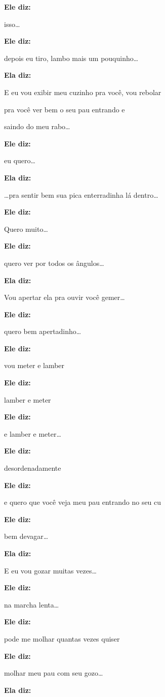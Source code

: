 \textbf{Ele diz:}

isso…

\textbf{Ele diz:}

depois eu tiro, lambo mais um pouquinho…

\textbf{Ela diz:}

E eu vou exibir meu cuzinho pra você, vou rebolar

pra você ver bem o seu pau entrando e

saindo do meu rabo…

\textbf{Ele diz:}

eu quero…

\textbf{Ela diz:}

…pra sentir bem sua pica enterradinha lá dentro…

\textbf{Ele diz:}

Quero muito…

\textbf{Ele diz:}

quero ver por todos os ângulos…

\textbf{Ela diz:}

Vou apertar ela pra ouvir você gemer…

\textbf{Ele diz:}

quero bem apertadinho…

\textbf{Ele diz:}

vou meter e lamber

\textbf{Ele diz:}

lamber e meter

\textbf{Ele diz:}

e lamber e meter…

\textbf{Ele diz:}

desordenadamente

\textbf{Ele diz:}

e quero que você veja meu pau entrando no seu cu

\textbf{Ele diz:}

bem devagar…

\textbf{Ela diz:}

E eu vou gozar muitas vezes…

\textbf{Ele diz:}

na marcha lenta…

\textbf{Ele diz:}

pode me molhar quantas vezes quiser

\textbf{Ele diz:}

molhar meu pau com seu gozo…

\textbf{Ela diz:}

